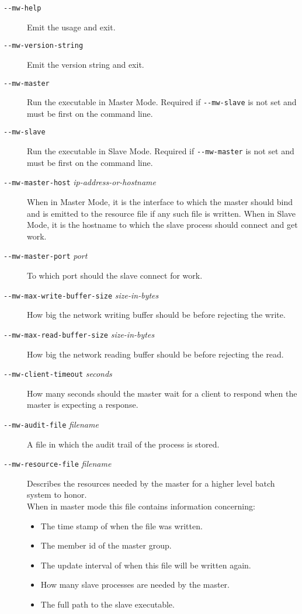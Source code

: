 \documentclass[titlepage,12pt]{book}
\newcommand{\dash}{\texttt{-}}
\newcommand{\Option}[1]{\dash\dash\texttt{#1}}
\newcommand{\OptionV}[2]{\dash\dash\texttt{#1} \textit{#2}}
\begin{document}
\begin{description}
\item[\Option{mw-help}]
    Emit the usage and exit.
\item[\Option{mw-version-string}]
    Emit the version string and exit.
\item[\Option{mw-master}]
    Run the executable in Master Mode. Required if \Option{mw-slave} is not set
	and must be first on the command line.
\item[\Option{mw-slave}]
    Run the executable in Slave Mode. Required if \Option{mw-master} is not set
	and must be first on the command line.
\item[\OptionV{mw-master-host}{ip-address-or-hostname}]
    When in Master Mode, it is the interface to which the master should
    bind and is emitted to the resource file if any such file is written.
    When in Slave Mode, it is the hostname to which the slave process
    should connect and get work.
\item[\OptionV{mw-master-port}{port}]
    To which port should the slave connect for work.
\item[\OptionV{mw-max-write-buffer-size}{size-in-bytes}]
    How big the network writing buffer should be before rejecting the write.
\item[\OptionV{mw-max-read-buffer-size}{size-in-bytes}]
    How big the network reading buffer should be before rejecting the read.
\item[\OptionV{mw-client-timeout}{seconds}]
    How many seconds should the master wait for a client to respond
    when the master is expecting a response.
\item[\OptionV{mw-audit-file}{filename}]
    A file in which the audit trail of the process is stored.
\item[\OptionV{mw-resource-file}{filename}]
    Describes the resources needed by the master for a higher level batch
    system to honor.\\
	When in master mode this file contains information concerning:
	\begin{itemize}
		\item The time stamp of when the file was written.
		\item The member id of the master group.
		\item The update interval of when this file will be written again.
		\item How many slave processes are needed by the master.
		\item The full path to the slave executable.

\end{itemize}
\end{description}
\end{document}
